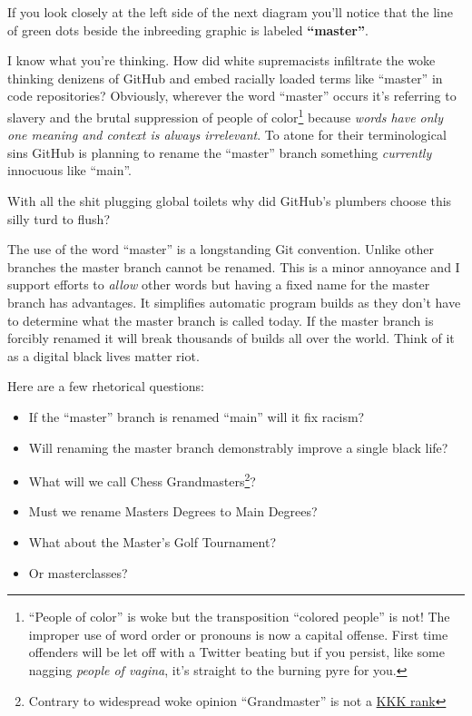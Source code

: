If you look closely at the left side of the next diagram you'll
notice that the line of green dots beside the inbreeding graphic is
labeled \textbf{``master''}.

I know what you're thinking. How did white supremacists infiltrate the
woke thinking denizens of GitHub and embed racially loaded terms like
``master'' in code repositories? Obviously, wherever the word ``master''
occurs it's referring to slavery and the brutal suppression of people of
color\footnote{``People of color'' is woke but the transposition ``colored people''
  is not! The improper use of word order or pronouns is now a capital
  offense. First time offenders will be let off with a Twitter beating
  but if you persist, like some nagging \emph{people of vagina}, it's straight
  to the burning pyre for you.
} because \emph{words %
have only one meaning and context is always irrelevant}. To atone for
their terminological sins GitHub is planning to rename the ``master''
branch something \emph{currently} innocuous like ``main''.

With all the shit plugging global toilets why did GitHub's plumbers
choose this silly turd to flush?

The use of the word ``master'' is a longstanding Git convention. Unlike
other branches the master branch cannot be renamed. This is a minor
annoyance and I support efforts to \emph{allow} other words but having a
fixed name for the master branch has advantages. It simplifies automatic
program builds as they don't have to determine what the master branch is
called today. If the master branch is forcibly renamed it will break
thousands of builds all over the world. Think of it as a digital black
lives matter riot.

Here are a few rhetorical questions:

\begin{itemize}
\item
  If the ``master'' branch is renamed ``main'' will it fix racism?
\item
  Will renaming the master branch demonstrably improve a single black
  life?
\item
  What will we call Chess %
  Grandmasters\footnote{Contrary to widespread woke opinion ``Grandmaster'' is not a
  \href{https://en.wikipedia.org/wiki/Grand_Wizard}{KKK rank}}?
\item
  Must we rename Masters Degrees to Main Degrees?
\item
  What about the Master's Golf Tournament?
\item
  Or masterclasses?
\end{itemize}

